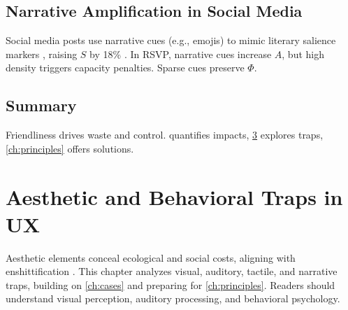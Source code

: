 \documentclass[openany]{book}
\newcommand{\PhiS}{\Phi} %
\newcommand{\Sent}{S} %
\begin{document}
\section{Narrative Amplification in Social Media}
\label{sec:cases-narrative}
Social media posts use narrative cues (e.g., emojis) to mimic literary salience markers \citep{lewis1942}, raising \(\Sent\) by 18\% \citep{colak2024}. In RSVP, narrative cues increase \(A\), but high density triggers capacity penalties. Sparse cues preserve \(\PhiS\).

\section{Summary}
Friendliness drives waste and control.  quantifies impacts, \cref{ch:aesthetic} explores traps, \cref{ch:principles} offers solutions.

\chapter{Aesthetic and Behavioral Traps in UX}
\label{ch:aesthetic}

Aesthetic elements conceal ecological and social costs, aligning with enshittification \citep{doctorow2022}. This chapter analyzes visual, auditory, tactile, and narrative traps, building on \cref{ch:cases} and preparing for \cref{ch:principles}. Readers should understand visual perception, auditory processing, and behavioral psychology.
\end{document}

